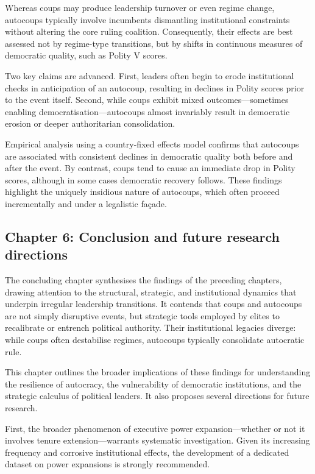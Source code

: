 \documentclass[
  12pt,
]{report}
\begin{document}
Whereas coups may produce leadership turnover or even regime change,
autocoups typically involve incumbents dismantling institutional
constraints without altering the core ruling coalition. Consequently,
their effects are best assessed not by regime-type transitions, but by
shifts in continuous measures of democratic quality, such as Polity V
scores.

Two key claims are advanced. First, leaders often begin to erode
institutional checks in anticipation of an autocoup, resulting in
declines in Polity scores prior to the event itself. Second, while coups
exhibit mixed outcomes---sometimes enabling democratisation---autocoups
almost invariably result in democratic erosion or deeper authoritarian
consolidation.

Empirical analysis using a country-fixed effects model confirms that
autocoups are associated with consistent declines in democratic quality
both before and after the event. By contrast, coups tend to cause an
immediate drop in Polity scores, although in some cases democratic
recovery follows. These findings highlight the uniquely insidious nature
of autocoups, which often proceed incrementally and under a legalistic
façade.

\subsection*{Chapter 6: Conclusion and future research
directions}\label{chapter-6-conclusion-and-future-research-directions}

The concluding chapter synthesises the findings of the preceding
chapters, drawing attention to the structural, strategic, and
institutional dynamics that underpin irregular leadership transitions.
It contends that coups and autocoups are not simply disruptive events,
but strategic tools employed by elites to recalibrate or entrench
political authority. Their institutional legacies diverge: while coups
often destabilise regimes, autocoups typically consolidate autocratic
rule.

This chapter outlines the broader implications of these findings for
understanding the resilience of autocracy, the vulnerability of
democratic institutions, and the strategic calculus of political
leaders. It also proposes several directions for future research.

First, the broader phenomenon of executive power expansion---whether or
not it involves tenure extension---warrants systematic investigation.
Given its increasing frequency and corrosive institutional effects, the
development of a dedicated dataset on power expansions is strongly
recommended.
\end{document}
